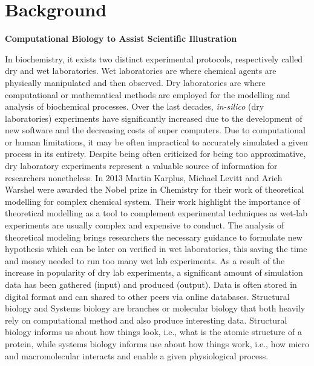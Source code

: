 \section{Background}

\textbf{Computational Biology to Assist Scientific Illustration}

%
%

%
%


In biochemistry, it exists two distinct experimental protocols, respectively called dry and wet laboratories.
Wet laboratories are where chemical agents are physically manipulated and then observed.
Dry laboratories are where computational or mathematical methods are employed for the modelling and analysis of biochemical processes. 
Over the last decades, \textit{in-silico} (dry laboratories) experiments have significantly increased due to the development of new software and the decreasing costs of super computers.
Due to computational or human limitations, it may be often impractical to accurately simulated a given process in its entirety.
Despite being often criticized for being too approximative, dry laboratory experiments represent a valuable source of information for researchers nonetheless.
In 2013 Martin Karplus, Michael Levitt and Arieh Warshel were awarded the Nobel prize in Chemistry for their work of theoretical modelling for complex chemical system.
Their work highlight the importance of theoretical modelling as a tool to complement experimental techniques as wet-lab experiments are usually complex and expensive to conduct.
The analysis of theoretical modeling brings researchers the necessary guidance to formulate new hypothesis which can be later on verified in wet laboratories, this saving the time and money needed to run too many wet lab experiments.
As a result of the increase in popularity of dry lab experiments, a significant amount of simulation data has been gathered (input) and produced (output).
Data is often stored in digital format and can shared to other peers via online databases.
Structural biology and Systems biology are branches or molecular biology that both heavily rely on computational method and also produce interesting data.
Structural biology informs us about how things look, i.e., what is the atomic structure of a protein, while systems biology informs use about how things work, i.e., how micro and macromolecular interacts and enable a given physiological process.

